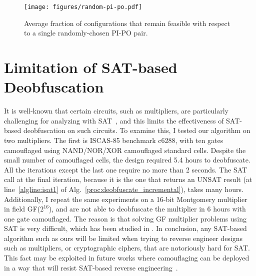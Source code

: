 \documentclass[proposal]{umassthesis}  %
\begin{document}
\begin{figure}[!hbt]
 \centering
 \texttt{[image: figures/random-pi-po.pdf]}
   \caption{Average fraction of configurations that remain feasible with respect to a single randomly-chosen PI-PO pair.}
    \vspace{-2mm}
    \label{fig:random_pi_po_test}
\end{figure}










\section{Limitation of SAT-based Deobfuscation}

It is well-known that certain circuits, such as multipliers, are particularly challenging for analyzing with SAT~\cite{cook1997finding}, and this limits the effectiveness of SAT-based deobfuscation on such circuits. To examine this, I tested our algorithm on two multipliers. The first is ISCAS-85 benchmark c6288, with ten gates camouflaged using NAND/NOR/XOR camouflaged standard cells. Despite the small number of camouflaged cells, the design required 5.4 hours to deobfuscate. All the iterations except the last one require no more than 2 seconds. The SAT call at the final iteration, because it is the one that returns an UNSAT result (at line~\ref{algline:isat1} of Alg.~\ref{proc:deobfuscate_incremental}), takes many hours. Additionally, I repeat the same experiments on a 16-bit Montgomery multiplier~\cite{koc1998montgomery} in field GF($2^{16}$), and are not able to deobfuscate the multiplier in 6 hours with one gate camouflaged. The reason is that solving GF multiplier problems using SAT is very difficult, which has been studied in \cite{lv2012efficient}. In conclusion, any SAT-based algorithm such as ours will be limited when trying to reverse engineer designs such as multipliers, or cryptographic ciphers, that are notoriously hard for SAT. This fact may be exploited in future works where camouflaging can be deployed in a way that will resist SAT-based reverse engineering~\cite{yasin-15}.
\end{document}
